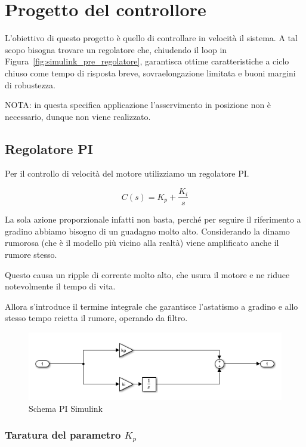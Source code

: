 \documentclass[a4paper,12pt]{article}
\begin{document}
\newpage

\section{Progetto del controllore}
L'obiettivo di questo progetto è quello di controllare in velocità il sistema. A tal scopo bisogna trovare un regolatore che, chiudendo il loop in Figura~\ref{fig:simulink_pre_regolatore}, garantisca ottime caratteristiche a ciclo chiuso come tempo di risposta breve, sovraelongazione limitata e buoni margini di robustezza.

NOTA: in questa specifica applicazione l'asservimento in posizione non è necessario, dunque non viene realizzato.

\subsection{Regolatore PI}
\label{specifiche2}
Per il controllo di velocità del motore utilizziamo un regolatore PI.

\[
    C(s)=K_p + \frac{K_i}{s}
\]


La sola azione proporzionale infatti non basta, perché per seguire il riferimento a gradino abbiamo bisogno di un guadagno molto alto. Considerando la dinamo rumorosa (che è il modello più vicino alla realtà) viene amplificato anche il rumore stesso.

Questo causa un ripple di corrente molto alto, che usura il motore e ne riduce notevolmente il tempo di vita.

Allora s'introduce il termine integrale che garantisce l'astatismo a gradino e allo stesso tempo reietta il rumore, operando da filtro.


\begin{figure}[h!]
\centering
    \includegraphics[scale=0.7]{Immagini/Altre/PISimulink.PNG}
    \caption{Schema PI Simulink}
    \label{fig:simulink_PI}
\end{figure}




\subsubsection{Taratura del parametro $K_p$}
\end{document}
